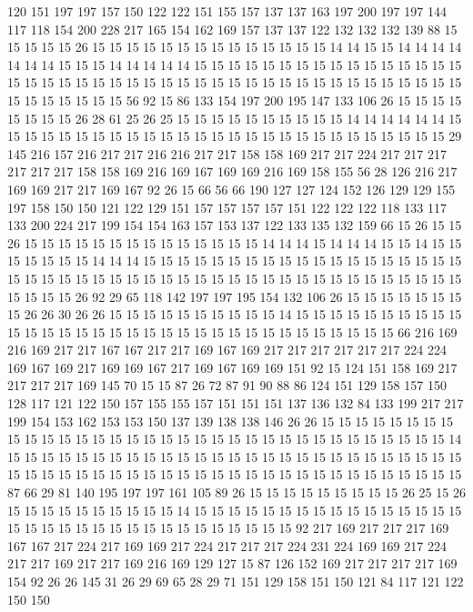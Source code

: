 120 151 197 197 157 150 122 122 151 155 157 137 137 163 197 200 197 197 144 117
118 154 200 228 217 165 154 162 169 157 137 137 122 132 132 132 139 88 15 15
15 15 15 26 15 15 15 15 15 15 15 15 15 15 15 15 15 15 14 14
15 15 14 14 14 14 14 14 14 15 15 15 14 14 14 14 14 15 15 15
15 15 15 15 15 15 15 15 15 15 15 15 15 15 15 15 15 15 15 15
15 15 15 15 15 15 15 15 15 15 15 15 15 15 15 15 15 15 15 15
15 15 15 15 15 15 15 56 92 15 86 133 154 197 200 195 147 133 106 26
15 15 15 15 15 15 15 15 26 28 61 25 26 25 15 15 15 15 15 15
15 15 15 15 14 14 14 14 14 14 15 15 15 15 15 15 15 15 15 15
15 15 15 15 15 15 15 15 15 15 15 15 15 15 15 15 15 29 145 216
157 216 217 217 216 216 217 217 158 158 169 217 217 224 217 217 217 217 217 217
158 158 169 216 169 167 169 169 216 169 158 155 56 28 126 216 217 169 169 217
217 169 167 92 26 15 66 56 66 190 127 127 124 152 126 129 129 155 197 158
150 150 121 122 129 151 157 157 157 157 151 122 122 122 118 133 117 133 200 224
217 199 154 154 163 157 153 137 122 133 135 132 159 66 15 26 15 15 26 15
15 15 15 15 15 15 15 15 15 15 15 15 15 14 14 14 15 14 14 14
15 15 14 15 15 15 15 15 15 15 14 14 14 15 15 15 15 15 15 15
15 15 15 15 15 15 15 15 15 15 15 15 15 15 15 15 15 15 15 15
15 15 15 15 15 15 15 15 15 15 15 15 15 15 15 15 15 15 15 15
15 15 15 26 92 29 65 118 142 197 197 195 154 132 106 26 15 15 15 15
15 15 15 15 26 26 30 26 26 15 15 15 15 15 15 15 15 15 15 14
15 15 15 15 15 15 15 15 15 15 15 15 15 15 15 15 15 15 15 15
15 15 15 15 15 15 15 15 15 15 15 15 15 66 216 169 216 169 217 217
167 167 217 217 169 167 169 217 217 217 217 217 217 224 224 169 167 169 217 169
169 167 217 169 167 169 169 151 92 15 124 151 158 169 217 217 217 217 169 145
70 15 15 87 26 72 87 91 90 88 86 124 151 129 158 157 150 128 117 121
122 150 157 155 155 157 151 151 151 137 136 132 84 133 199 217 217 199 154 153
162 153 153 150 137 139 138 138 146 26 26 15 15 15 15 15 15 15 15 15
15 15 15 15 15 15 15 15 15 15 15 15 15 15 15 15 15 15 15 15
15 15 15 15 15 14 15 15 15 15 15 15 15 15 15 15 15 15 15 15
15 15 15 15 15 15 15 15 15 15 15 15 15 15 15 15 15 15 15 15
15 15 15 15 15 15 15 15 15 15 15 15 15 15 15 15 15 15 15 15
87 66 29 81 140 195 197 197 161 105 89 26 15 15 15 15 15 15 15 15
15 26 25 15 26 15 15 15 15 15 15 15 15 15 15 14 15 15 15 15
15 15 15 15 15 15 15 15 15 15 15 15 15 15 15 15 15 15 15 15
15 15 15 15 15 15 15 15 15 92 217 169 217 217 217 169 167 167 217 224
217 169 169 217 224 217 217 217 224 231 224 169 169 217 224 217 217 169 217 217
169 216 169 129 127 15 87 126 152 169 217 217 217 217 169 154 92 26 26 145
31 26 29 69 65 28 29 71 151 129 158 151 150 121 84 117 121 122 150 150
